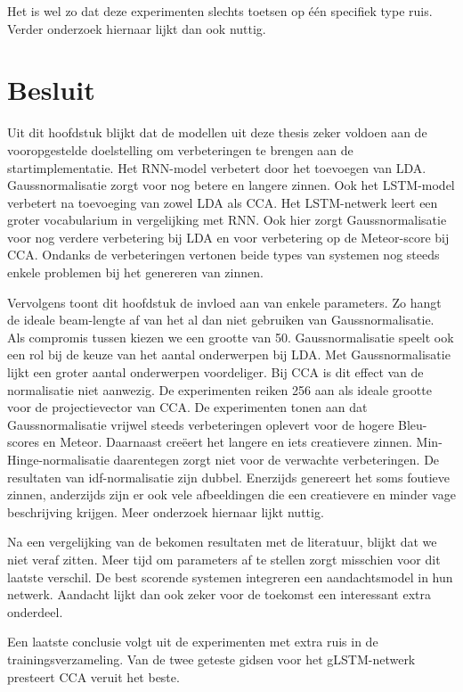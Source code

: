 Het is wel zo dat deze experimenten slechts toetsen op \'e\'en specifiek type ruis. Verder onderzoek hiernaar lijkt dan ook nuttig.

\section{Besluit} %
\label{sec:besluit}
Uit dit hoofdstuk blijkt dat de modellen uit deze thesis zeker voldoen aan de vooropgestelde doelstelling om verbeteringen te brengen aan de startimplementatie. Het RNN-model verbetert door het toevoegen van LDA. Gaussnormalisatie zorgt voor nog betere en langere zinnen.
Ook het LSTM-model verbetert na toevoeging van zowel LDA als CCA. Het LSTM-netwerk leert een groter vocabularium in vergelijking met RNN. Ook hier zorgt Gaussnormalisatie voor nog verdere verbetering bij LDA en voor verbetering op de Meteor-score bij CCA.
Ondanks de verbeteringen vertonen beide types van systemen nog steeds enkele problemen bij het genereren van zinnen.

Vervolgens toont dit hoofdstuk de invloed aan van enkele parameters. Zo hangt de ideale beam-lengte af van het al dan niet gebruiken van Gaussnormalisatie. Als compromis tussen kiezen we een grootte van 50.
Gaussnormalisatie speelt ook een rol bij de keuze van het aantal onderwerpen bij LDA. Met Gaussnormalisatie lijkt een groter aantal onderwerpen voordeliger.
Bij CCA is dit effect van de normalisatie niet aanwezig. De experimenten reiken 256 aan als ideale grootte voor de projectievector van CCA.
De experimenten tonen aan dat Gaussnormalisatie vrijwel steeds verbeteringen oplevert voor de hogere Bleu-scores en Meteor. Daarnaast cre\"eert het langere en iets creatievere zinnen. Min-Hinge-normalisatie daarentegen zorgt niet voor de verwachte verbeteringen.
De resultaten van idf-normalisatie zijn dubbel. Enerzijds genereert het soms foutieve zinnen, anderzijds zijn er ook vele afbeeldingen die een creatievere en minder vage beschrijving krijgen. Meer onderzoek hiernaar lijkt nuttig.

Na een vergelijking van de bekomen resultaten met de literatuur, blijkt dat we niet veraf zitten. Meer tijd om parameters af te stellen zorgt misschien voor dit laatste verschil. De best scorende systemen integreren een aandachtsmodel in hun netwerk. Aandacht lijkt dan ook zeker voor de toekomst een interessant extra onderdeel.

Een laatste conclusie volgt uit de experimenten met extra ruis in de trainingsverzameling. Van de twee geteste gidsen voor het gLSTM-netwerk presteert CCA veruit het beste.


